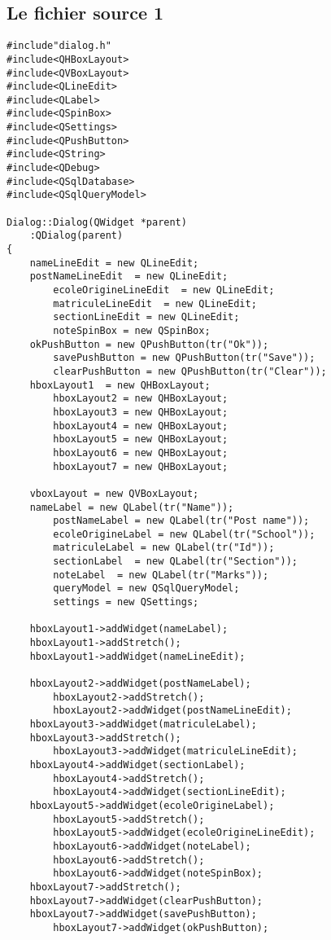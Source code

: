 \documentclass[a4paper, oneside,11pt]{book}
\begin{document}
\subsection*{Le fichier source 1}

\begin{lstlisting}
#include"dialog.h"
#include<QHBoxLayout>
#include<QVBoxLayout>
#include<QLineEdit>
#include<QLabel>
#include<QSpinBox>
#include<QSettings>
#include<QPushButton>
#include<QString>
#include<QDebug>
#include<QSqlDatabase>
#include<QSqlQueryModel>

Dialog::Dialog(QWidget *parent)
	:QDialog(parent)
{
	nameLineEdit = new QLineEdit;
	postNameLineEdit  = new QLineEdit;
        ecoleOrigineLineEdit  = new QLineEdit;
        matriculeLineEdit  = new QLineEdit;
        sectionLineEdit = new QLineEdit;
        noteSpinBox = new QSpinBox;
	okPushButton = new QPushButton(tr("Ok"));
        savePushButton = new QPushButton(tr("Save"));
        clearPushButton = new QPushButton(tr("Clear"));
	hboxLayout1  = new QHBoxLayout;
        hboxLayout2 = new QHBoxLayout;
        hboxLayout3 = new QHBoxLayout;
        hboxLayout4 = new QHBoxLayout;
        hboxLayout5 = new QHBoxLayout;
        hboxLayout6 = new QHBoxLayout;
        hboxLayout7 = new QHBoxLayout;

	vboxLayout = new QVBoxLayout;
	nameLabel = new QLabel(tr("Name"));
        postNameLabel = new QLabel(tr("Post name"));
        ecoleOrigineLabel = new QLabel(tr("School"));
        matriculeLabel = new QLabel(tr("Id"));
        sectionLabel  = new QLabel(tr("Section"));
        noteLabel  = new QLabel(tr("Marks"));
        queryModel = new QSqlQueryModel;
        settings = new QSettings;

	hboxLayout1->addWidget(nameLabel);
	hboxLayout1->addStretch();
	hboxLayout1->addWidget(nameLineEdit);

	hboxLayout2->addWidget(postNameLabel);
        hboxLayout2->addStretch();
        hboxLayout2->addWidget(postNameLineEdit);
	hboxLayout3->addWidget(matriculeLabel);
	hboxLayout3->addStretch();
        hboxLayout3->addWidget(matriculeLineEdit);
	hboxLayout4->addWidget(sectionLabel);
        hboxLayout4->addStretch();
        hboxLayout4->addWidget(sectionLineEdit);
	hboxLayout5->addWidget(ecoleOrigineLabel);
        hboxLayout5->addStretch();
        hboxLayout5->addWidget(ecoleOrigineLineEdit);
        hboxLayout6->addWidget(noteLabel);
        hboxLayout6->addStretch();
        hboxLayout6->addWidget(noteSpinBox);
	hboxLayout7->addStretch();
	hboxLayout7->addWidget(clearPushButton);
	hboxLayout7->addWidget(savePushButton);
        hboxLayout7->addWidget(okPushButton);


\end{lstlisting}
\end{document}
